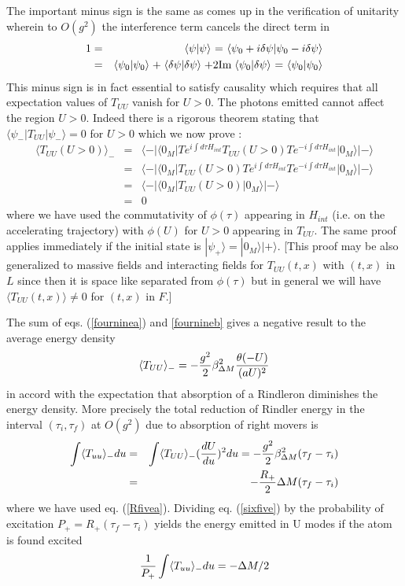 \documentclass[12pt,oneside]{report}
\def\ket#1{|#1\rangle}
\def\bra#1{\langle #1|}
\def\braket#1#2{\mathrel{\langle #1|#2\rangle}}
\def\elematrice#1#2#3{\langle #1|#2|#3 \rangle}
\begin{document}
The important minus sign is the same as comes up in the verification of
unitarity wherein to $O(g^2)$ the interference term  cancels
the direct term in 
\begin{eqnarray}
1&=& \braket{\psi}{\psi}\ =\ \braket{\psi_0 + i\delta \psi}
{\psi_0 -i \delta \psi}
\nonumber\\
&=&
\braket{\psi_0 }
{\psi_0 } + \braket{ \delta \psi}
{\delta \psi} +  2 {\rm Im} \braket{\psi_0 }
{ \delta \psi}\ =\ \braket{\psi_0 }
{\psi_0}
\label{unit}
\end{eqnarray}
This minus sign is in fact essential to satisfy causality which requires
that all expectation values of $T_{UU}$ vanish for $U>0$. The photons
emitted cannot affect the region $U>0$. Indeed there is a rigorous
theorem stating that $\elematrice{\psi_-}{T_{UU}}{\psi_-} = 0$ for $U>0$
which we now prove \cite{UnWa}:
\begin{eqnarray}
\langle T_{UU}(U>0) \rangle _-
&=& \bra{-}\elematrice{0_M}{Te^{i \int d\tau H_{int}} T_{UU}(U>0)
Te^{-i \int d\tau H_{int}} }{0_M}\ket{-}\nonumber\\
&=& \bra{-}\elematrice{0_M}{ T_{UU}(U>0)T e^{i \int d\tau H_{int}}
Te^{-i \int d\tau H_{int}} }{0_M}\ket{-}\nonumber\\
&=& \bra{-}\elematrice{0_M}{ T_{UU}(U>0) }{0_M}\ket{-} \nonumber\\
&=& 0
\label{fivesix}
\end{eqnarray}
where we have used the commutativity of $\phi(\tau)$ appearing in $H_{int}$
(i.e. on the accelerating trajectory) with $\phi(U)$ for $U>0$ appearing in
$T_{UU}$. The same proof applies immediately if the initial state is
$\ket{\psi_+}= \ket{0_M} \ket{+}$.
[This proof may be also generalized to massive fields and interacting
fields for $T_{UU}(t,x)$ with $(t,x)$ in $L$ since then
it is space like separated from $\phi(\tau)$ but in general we will have 
$\langle T_{UU} (t,x) \rangle \neq 0$ for $(t,x)$ in $F$.]


The sum of  eqs. (\ref{fourninea}) and \ref{fournineb} gives a negative result to
the average energy density
\begin{equation}
 \langle T_{UU} \rangle_- = -{g^2 \over 2}\beta^2_{\Delta M} 
{\theta (-U) \over (a U)^2}
\label{fournine}
\end{equation}
in accord with the expectation that absorption of a Rindleron diminishes
the energy density. More precisely the total reduction of Rindler energy in
the interval $(\tau_i, \tau_f)$ at $O(g^2)$ due to absorption of right movers
is 
\begin{eqnarray}
\int \langle {T_{uu}} \rangle_- du &=&
\int \langle T_{UU} \rangle_- ({dU \over du})^2 du
=-{g^2 \over 2} \beta_{\Delta M}^2 (\tau_f - \tau_i)
\nonumber\\
&=& - {R_+\over 2} {\Delta M} (\tau_f - \tau_i)
\label{sixfive}
\end{eqnarray}
where we have used eq. (\ref{Rfivea}). Dividing  eq. (\ref{sixfive}) by the
probability of excitation $P_+= R_+(\tau_f-\tau_i)$ yields the energy emitted in
U modes if the atom is found excited
\begin{equation}
{1\over P_+}\int \langle {T_{uu}} \rangle_- du = -{\Delta M / 2}
\label{enmode}\end{equation}
\end{document}
